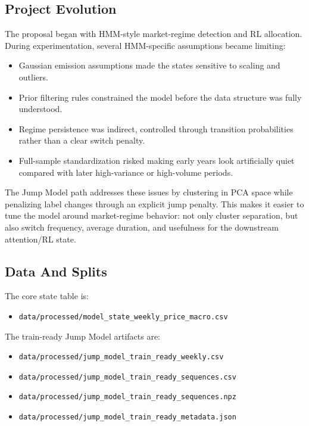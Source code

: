 \subsection{Project Evolution}\label{project-evolution}

The proposal began with HMM-style market-regime detection and RL
allocation. During experimentation, several HMM-specific assumptions
became limiting:

\begin{itemize}
\tightlist
\item
  Gaussian emission assumptions made the states sensitive to scaling and
  outliers.
\item
  Prior filtering rules constrained the model before the data structure
  was fully understood.
\item
  Regime persistence was indirect, controlled through transition
  probabilities rather than a clear switch penalty.
\item
  Full-sample standardization risked making early years look
  artificially quiet compared with later high-variance or high-volume
  periods.
\end{itemize}

The Jump Model path addresses these issues by clustering in PCA space
while penalizing label changes through an explicit jump penalty. This
makes it easier to tune the model around market-regime behavior: not
only cluster separation, but also switch frequency, average duration,
and usefulness for the downstream attention/RL state.

\subsection{Data And Splits}\label{data-and-splits}

The core state table is:

\begin{itemize}
\tightlist
\item
  \texttt{data/processed/model\_state\_weekly\_price\_macro.csv}
\end{itemize}

The train-ready Jump Model artifacts are:

\begin{itemize}
\tightlist
\item
  \texttt{data/processed/jump\_model\_train\_ready\_weekly.csv}
\item
  \texttt{data/processed/jump\_model\_train\_ready\_sequences.csv}
\item
  \texttt{data/processed/jump\_model\_train\_ready\_sequences.npz}
\item
  \texttt{data/processed/jump\_model\_train\_ready\_metadata.json}
\end{itemize}

